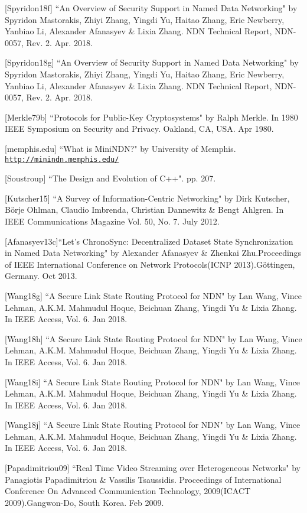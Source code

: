 [Spyridon18f] ``An Overview of Security Support in Named Data Networking" by Spyridon Mastorakis, Zhiyi Zhang, Yingdi Yu, Haitao Zhang, Eric Newberry, Yanbiao Li, Alexander Afanasyev \& Lixia Zhang. NDN Technical Report, NDN-0057, Rev. 2. Apr. 2018.


[Spyridon18g] ``An Overview of Security Support in Named Data Networking" by Spyridon Mastorakis, Zhiyi Zhang, Yingdi Yu, Haitao Zhang, Eric Newberry, Yanbiao Li, Alexander Afanasyev \& Lixia Zhang. NDN Technical Report, NDN-0057, Rev. 2. Apr. 2018.


[Merkle79b]  ``Protocols for Public-Key Cryptosystems" by Ralph Merkle. In 1980 IEEE Symposium on Security and Privacy. Oakland, CA, USA. Apr 1980.


[memphis.edu] ``What is MiniNDN?" by University of Memphis. \texttt{\url{http://minindn.memphis.edu/}}

[Soustroup] ``The Design and Evolution of C++". pp. 207.

[Kutscher15] ``A Survey of Information-Centric Networking" by Dirk Kutscher,  Börje Ohlman, Claudio Imbrenda, Christian Dannewitz \& Bengt Ahlgren. In IEEE Communications Magazine Vol. 50, No. 7. July 2012.

[Afanasyev13c]``Let's ChronoSync: Decentralized Dataset State
Synchronization in Named Data Networking" by Alexander Afanasyev \& Zhenkai Zhu.Proceedings of  IEEE International Conference on Network Protocols(ICNP 2013).Göttingen, Germany. Oct 2013.

[Wang18g] ``A Secure Link State Routing Protocol for NDN" by Lan Wang, Vince Lehman, A.K.M. Mahmudul Hoque, Beichuan Zhang, Yingdi Yu \& Lixia Zhang. In IEEE Access, Vol. 6. Jan 2018.


[Wang18h] ``A Secure Link State Routing Protocol for NDN" by Lan Wang, Vince Lehman, A.K.M. Mahmudul Hoque, Beichuan Zhang, Yingdi Yu \& Lixia Zhang. In IEEE Access, Vol. 6. Jan 2018.
 

[Wang18i] ``A Secure Link State Routing Protocol for NDN" by Lan Wang, Vince Lehman, A.K.M. Mahmudul Hoque, Beichuan Zhang, Yingdi Yu \& Lixia Zhang. In IEEE Access, Vol. 6. Jan 2018.
 

[Wang18j] ``A Secure Link State Routing Protocol for NDN" by Lan Wang, Vince Lehman, A.K.M. Mahmudul Hoque, Beichuan Zhang, Yingdi Yu \& Lixia Zhang. In IEEE Access, Vol. 6. Jan 2018.

[Papadimitriou09] ``Real Time Video Streaming over Heterogeneous Networks" by Panagiotis Papadimitriou \& Vassilis Tsaussidis. Proceedings of  International Conference On Advanced Communication Technology, 2009(ICACT 2009).Gangwon-Do, South Korea. Feb 2009.
